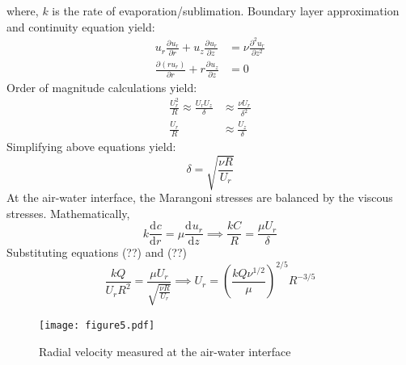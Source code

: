 \documentclass[aps, twocolumn, floatfix, superscriptaddress]{revtex4}
\newcommand{\tdc}[3][]{\frac{\mathrm{d}^{#1}#2}{\mathrm{d}#3^{#1}}} %
\newcommand{\pdc}[3][]{\frac{\partial^{#1} #2}{\partial #3^{#1}}} %
\begin{document}
where, $k$ is the rate of evaporation/sublimation. 
Boundary layer approximation and continuity equation yield: 
\begin{align}
u_{r}\pdc{u_{r}}{r} + u_{z}\pdc{u_{r}}{z} &= \nu \pdc[2]{u_{r}}{z} \\
\pdc{(ru_{r})}{r} + r\pdc{u_{z}}{z} &= 0
\end{align}
Order of magnitude calculations yield:
\begin{align}
\frac{U_{r}^{2}}{R} \approx \frac{U_{r}U_{z}}{\delta} &\approx \frac{\nu U_{r}}{\delta^{2}} \\ 
\frac{U_{r}}{R} &\approx \frac{U_{z}}{\delta} 
\end{align}
Simplifying above equations yield:
\begin{equation}
\delta = \sqrt{\frac{\nu R}{U_{r}}}
\end{equation}
At the air-water interface, the Marangoni stresses are balanced by the viscous stresses. Mathematically,
\begin{equation}
k\tdc{c}{r} = \mu \tdc{u_{r}}{z} \implies \frac{kC}{R} = \frac{\mu U_{r}}{\delta}
\end{equation}
Substituting equations (??) and (??) 
\begin{equation}
\frac{kQ}{U_{r}R^{2}} = \frac{\mu U_{r}}{\sqrt{\frac{\nu R}{U_{r}}}} \implies
\boxed{U_{r} = \left(\frac{kQ\nu^{1/2}}{\mu}\right)^{2/5} R^{-3/5}}
\end{equation}
\begin{figure}[ht] 
    \begin{center}
       \texttt{[image: figure5.pdf]}
    \end{center}
    \caption{Radial velocity measured at the air-water interface}
    \label{fig:radvel}
\end{figure}
\end{document}
